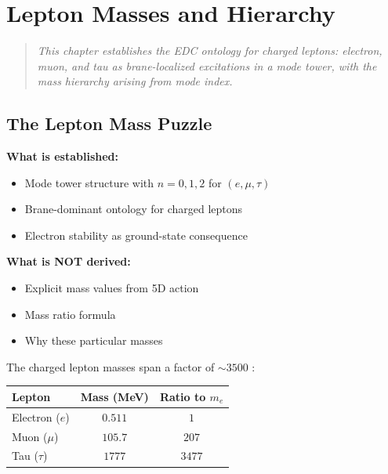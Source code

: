 \chapter{Lepton Masses and Hierarchy}
\label{ch:leptons}

\begin{quote}
\textit{This chapter establishes the EDC ontology for charged leptons:
electron, muon, and tau as brane-localized excitations in a mode tower,
with the mass hierarchy arising from mode index.}
\end{quote}

\section{The Lepton Mass Puzzle}
\label{sec:lepton_puzzle}

\begin{tcolorbox}[edcGuardrail, title=\textbf{Epistemic Status}]
\textbf{What is established:}
\begin{itemize}[nosep]
    \item Mode tower structure with $n = 0, 1, 2$ for $(e, \mu, \tau)$ \tagI{}
    \item Brane-dominant ontology for charged leptons \tagP{}
    \item Electron stability as ground-state consequence \tagDc{}
\end{itemize}

\textbf{What is NOT derived:}
\begin{itemize}[nosep]
    \item Explicit mass values from 5D action
    \item Mass ratio formula
    \item Why these particular masses
\end{itemize}
\end{tcolorbox}

The charged lepton masses span a factor of $\sim 3500$ \tagBL{}:
\begin{center}
\begin{tabular}{lcc}
\toprule
\textbf{Lepton} & \textbf{Mass (MeV)} & \textbf{Ratio to $m_e$} \\
\midrule
Electron ($e$) & $0.511$ & $1$ \\
Muon ($\mu$) & $105.7$ & $207$ \\
Tau ($\tau$) & $1777$ & $3477$ \\
\bottomrule
\end{tabular}
\end{center}


